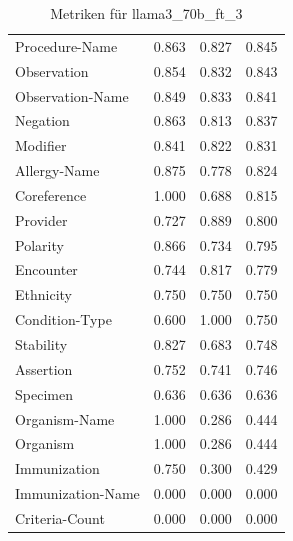 \begin{table}[htbp]
\begin{tabular}{p{5cm}ccc}
Procedure-Name & 0.863 & 0.827 & 0.845 \\
Observation & 0.854 & 0.832 & 0.843 \\
Observation-Name & 0.849 & 0.833 & 0.841 \\
Negation & 0.863 & 0.813 & 0.837 \\
Modifier & 0.841 & 0.822 & 0.831 \\
Allergy-Name & 0.875 & 0.778 & 0.824 \\
Coreference & 1.000 & 0.688 & 0.815 \\
Provider & 0.727 & 0.889 & 0.800 \\
Polarity & 0.866 & 0.734 & 0.795 \\
Encounter & 0.744 & 0.817 & 0.779 \\
Ethnicity & 0.750 & 0.750 & 0.750 \\
Condition-Type & 0.600 & 1.000 & 0.750 \\
Stability & 0.827 & 0.683 & 0.748 \\
Assertion & 0.752 & 0.741 & 0.746 \\
Specimen & 0.636 & 0.636 & 0.636 \\
Organism-Name & 1.000 & 0.286 & 0.444 \\
Organism & 1.000 & 0.286 & 0.444 \\
Immunization & 0.750 & 0.300 & 0.429 \\
Immunization-Name & 0.000 & 0.000 & 0.000 \\
Criteria-Count & 0.000 & 0.000 & 0.000 \\
\bottomrule
\end{tabular}
\caption{Metriken für llama3_70b_ft_3}
\label{tab:metrics_llama3_70b_ft_3}
\end{table}